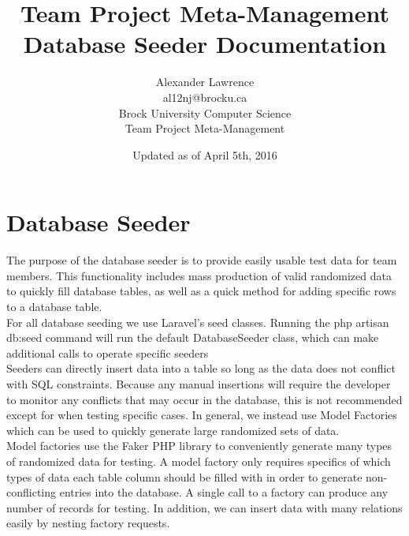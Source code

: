 \documentclass[]{article}
\title{Team Project Meta-Management \\ Database Seeder Documentation}
\author{Alexander Lawrence \\ al12nj@brocku.ca \\ Brock University Computer Science\\Team Project Meta-Management\\}
\date{Updated as of April 5th, 2016}
\begin{document}
\maketitle

\thispagestyle{fancy}


\section{Database Seeder}
The purpose of the database seeder is to provide easily usable test data for team members. This functionality includes mass production of valid randomized data to quickly fill database tables, as well as a quick method for adding specific rows to a database table.
\\
For all database seeding we use Laravel's seed classes. Running the php artisan db:seed command will run the default DatabaseSeeder class, which can make additional calls to operate specific seeders
\\
Seeders can directly insert data into a table so long as the data does not conflict with SQL constraints. Because any manual insertions will require the developer to monitor any conflicts that may occur in the database, this is not recommended except for when testing specific cases. In general, we instead use Model Factories which can be used to quickly generate large randomized sets of data. 
\\
Model factories use the Faker PHP library to conveniently generate many types of randomized data for testing. A model factory only requires specifics of which types of data each table column should be filled with in order to generate non-conflicting entries into the database. A single call to a factory can produce any number of records for testing. In addition, we can insert data with many relations easily by nesting factory requests.
\\



\pagebreak
{}
\end{document}
